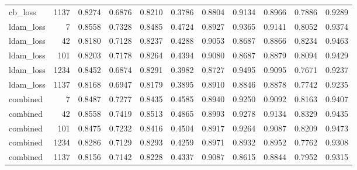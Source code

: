 \begin{table}
\begin{tabular}{lrrrrrrrrrr}
cb\_loss & 1137 & 0.8274 & 0.6876 & 0.8210 & 0.3786 & 0.8804 & 0.9134 & 0.8966 & 0.7886 & 0.9289 \\
ldam\_loss & 7 & 0.8558 & 0.7328 & 0.8485 & 0.4724 & 0.8927 & 0.9365 & 0.9141 & 0.8052 & 0.9374 \\
ldam\_loss & 42 & 0.8180 & 0.7128 & 0.8237 & 0.4288 & 0.9053 & 0.8687 & 0.8866 & 0.8234 & 0.9463 \\
ldam\_loss & 101 & 0.8203 & 0.7178 & 0.8264 & 0.4394 & 0.9080 & 0.8687 & 0.8879 & 0.8094 & 0.9429 \\
ldam\_loss & 1234 & 0.8452 & 0.6874 & 0.8291 & 0.3982 & 0.8727 & 0.9495 & 0.9095 & 0.7671 & 0.9237 \\
ldam\_loss & 1137 & 0.8168 & 0.6947 & 0.8179 & 0.3895 & 0.8910 & 0.8846 & 0.8878 & 0.7742 & 0.9235 \\
combined & 7 & 0.8487 & 0.7277 & 0.8435 & 0.4585 & 0.8940 & 0.9250 & 0.9092 & 0.8163 & 0.9407 \\
combined & 42 & 0.8558 & 0.7419 & 0.8513 & 0.4865 & 0.8993 & 0.9278 & 0.9134 & 0.8329 & 0.9435 \\
combined & 101 & 0.8475 & 0.7232 & 0.8416 & 0.4504 & 0.8917 & 0.9264 & 0.9087 & 0.8209 & 0.9473 \\
combined & 1234 & 0.8286 & 0.7129 & 0.8293 & 0.4259 & 0.8971 & 0.8932 & 0.8952 & 0.7762 & 0.9308 \\
combined & 1137 & 0.8156 & 0.7142 & 0.8228 & 0.4337 & 0.9087 & 0.8615 & 0.8844 & 0.7952 & 0.9315 \\
\bottomrule
\end{tabular}
\end{table}
